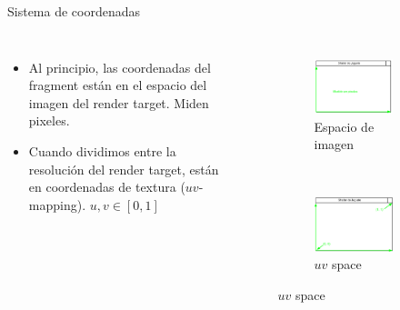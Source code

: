 \begin{frame}{Sistema de coordenadas}
\begin{columns}
    \begin{itemize}
         \item Al principio, las coordenadas del fragment están en el espacio del imagen del render target. Miden pixeles.
         \item Cuando dividimos entre la resolución del render target, están en coordenadas de textura ($uv$-mapping). $u,v \in [ 0,1 ]$
     \end{itemize}
\begin{figure}[htp]
 \centering
 \begin{subfigure}[b]{0.45\textwidth}
   \includegraphics[width=\textwidth]{img/FrameOfreference}
   \caption{Espacio de imagen}
 \end{subfigure}
\\
 \begin{subfigure}[b]{0.45\textwidth}
   \includegraphics[width=\textwidth]{img/FoRUVSpace}
   \caption{$uv$ space}
 \end{subfigure}
\end{figure}
\end{columns}
\end{frame}

